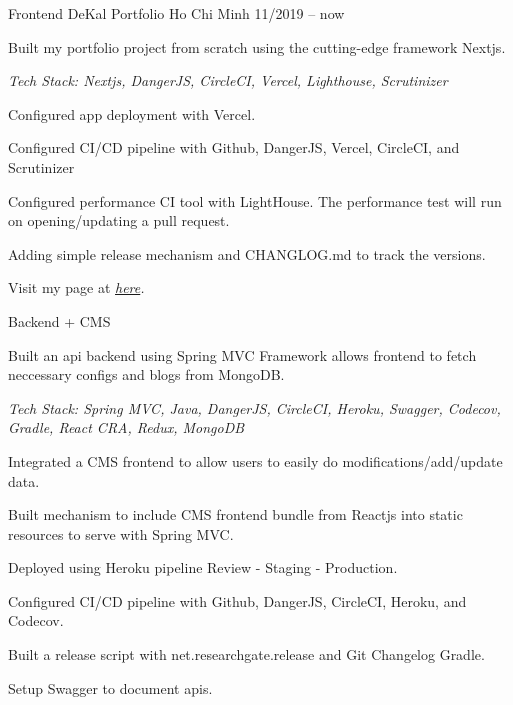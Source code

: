
\begin{cventries}

    \cventry
    {Frontend} %
    {DeKal Portfolio} %
    {Ho Chi Minh} %
    {11/2019 -- now} %
    {
      \begin{cvitems} %
         \item {Built my portfolio project from scratch using the cutting-edge framework Nextjs.}
         \item[] {\it Tech Stack: Nextjs, DangerJS, CircleCI, Vercel, Lighthouse, Scrutinizer}
        \item {Configured app deployment with Vercel.}
        \item {Configured CI/CD pipeline with Github, DangerJS, Vercel, CircleCI, and Scrutinizer}
        \item {Configured performance CI tool with LightHouse. The performance test will run on opening/updating a pull request.}
        \item {Adding simple release mechanism and CHANGLOG.md to track the versions.}
        \item {Visit my page at \it \href{https://phatho-folio.now.sh/}{here}. }
      \end{cvitems}
    }

    \cventry
    {Backend + CMS} %
    {} %
    {} %
    {} %
    {
      \begin{cvitems} %
        \item {Built an api backend using Spring MVC Framework allows frontend to fetch neccessary configs and blogs from MongoDB.}
        \item[] {\it Tech Stack: Spring MVC, Java, DangerJS, CircleCI, Heroku, Swagger, Codecov, Gradle, React CRA, Redux, MongoDB}
        \item {Integrated a CMS frontend to allow users to easily do modifications/add/update data.}
        \item {Built mechanism to include CMS frontend bundle from Reactjs into static resources to serve with Spring MVC.}
        \item {Deployed using Heroku pipeline Review - Staging - Production.}
        \item {Configured CI/CD pipeline with Github, DangerJS, CircleCI, Heroku, and Codecov.}
        \item {Built a release script with net.researchgate.release and Git Changelog Gradle.}
        \item {Setup Swagger to document apis. }
      \end{cvitems}
    }


\end{cventries}
